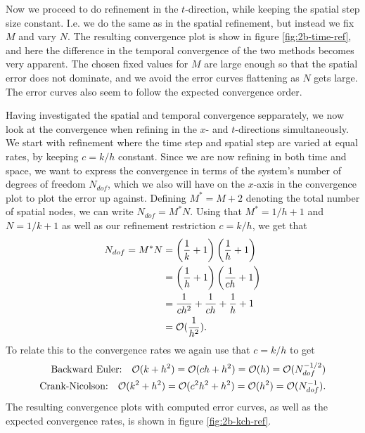 Now we proceed to do refinement in the $t$-direction, 
while keeping the spatial step size constant. 
I.e. we do the same as in the spatial refinement, 
but instead we fix $M$ and vary $N$. 
The resulting convergence plot is show in figure \ref{fig:2b-time-ref}, 
and here the difference in the temporal convergence of the two methods becomes very apparent. 
The chosen fixed values for $M$ are large enough so that the spatial error does not dominate, 
and we avoid the error curves flattening as $N$ gets large. 
The error curves also seem to follow the expected convergence order. 

Having investigated the spatial and temporal convergence sepparately, 
we now look at the convergence when refining in the $x$- and $t$-directions simultaneously. 
We start with refinement where the time step and spatial step are varied at equal rates, 
by keeping $c = k/h$ constant. 
Since we are now refining in both time and space, 
we want to express the convergence in terms of the system's number of degrees of freedom $N_{dof}$, 
which we also will have on the $x$-axis in the convergence plot to plot the error up against. 
Defining $M^* = M+2$ denoting the total number of spatial nodes, 
we can write $N_{dof} = M^*N$. 
Using that $M^*=1/h+1$ and $N=1/k+1$ as well as our refinement restriction $c = k/h$, we get that 
\begin{equation*}
\begin{split}
    N_{dof} = M^* N & = \left(\frac{1}{k}+1\right)\left(\frac{1}{h}+1\right)
    \\ & = \left(\frac{1}{h}+1\right)\left(\frac{1}{ch}+1\right)
    \\ & = \frac{1}{ch^2} + \frac{1}{ch} + \frac{1}{h} + 1 
    \\ & = \mathcal{O}(\frac{1}{h^2}).
\end{split}
\end{equation*}
To relate this to the convergence rates we again use that $c=k/h$ to get 
\begin{equation*}
\begin{split}
    \text{Backward Euler:} \quad \mathcal{O}(k+h^2) = \mathcal{O}(ch+h^2) = \mathcal{O}(h) = \mathcal{O}(N_{dof}^{-1/2})\\
    \text{Crank-Nicolson:} \quad \mathcal{O}(k^2+h^2) = \mathcal{O}(c^2 h^2+h^2) = \mathcal{O}(h^2) = \mathcal{O}(N_{dof}^{-1}). 
\end{split}
\end{equation*}
The resulting convergence plots with computed error curves, 
as well as the expected convergence rates,
is shown in figure \ref{fig:2b-kch-ref}. 
